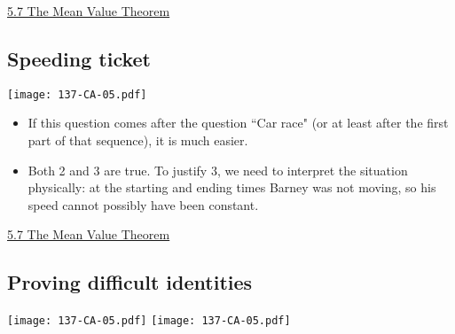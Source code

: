 \documentclass[11pt]{article}
\newcommand{\nl}{\hfill \vspace{-1.1\baselineskip}} %
\newcommand{\vvii}{\hspace{8mm} \href{https://www.youtube.com/watch?v=DKFV3KMDKHc&list=PLlwePzQY_wW9m5oabUf6hvfVfAaA9uAwM&index=7}{5.7 The Mean Value Theorem}}
\begin{document}
\begin{videos}
\vvii
\end{videos}

\newpage
\subsection{Speeding ticket}

\begin{center}
{ \texttt{[image: 137-CA-05.pdf]}} 
\end{center}


\begin{comments}
\nl
\begin{itemize}
\item   If this question comes after the question ``Car race" (or at least after the first part of that sequence), it is much easier.  
\item Both 2 and 3 are true.  To justify 3, we need to interpret the situation physically: at the starting and ending times Barney was not moving, so his speed cannot possibly have been constant.
\end{itemize}	
\end{comments}

\begin{videos}
\vvii
\end{videos}

\newpage

\subsection{Proving difficult identities}

\begin{center}
{ \texttt{[image: 137-CA-05.pdf]}} \quad
{ \texttt{[image: 137-CA-05.pdf]}} 
\end{center}
\end{document}
